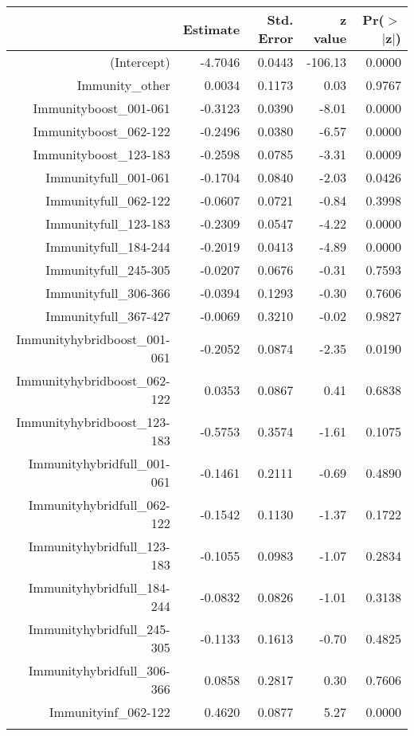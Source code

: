 \begin{table}[ht]
\centering
\begin{tabular}{rrrrr}
  \hline
 & Estimate & Std. Error & z value & Pr($>$$|$z$|$) \\ 
  \hline
(Intercept) & -4.7046 & 0.0443 & -106.13 & 0.0000 \\ 
  Immunity\_other & 0.0034 & 0.1173 & 0.03 & 0.9767 \\ 
  Immunityboost\_001-061 & -0.3123 & 0.0390 & -8.01 & 0.0000 \\ 
  Immunityboost\_062-122 & -0.2496 & 0.0380 & -6.57 & 0.0000 \\ 
  Immunityboost\_123-183 & -0.2598 & 0.0785 & -3.31 & 0.0009 \\ 
  Immunityfull\_001-061 & -0.1704 & 0.0840 & -2.03 & 0.0426 \\ 
  Immunityfull\_062-122 & -0.0607 & 0.0721 & -0.84 & 0.3998 \\ 
  Immunityfull\_123-183 & -0.2309 & 0.0547 & -4.22 & 0.0000 \\ 
  Immunityfull\_184-244 & -0.2019 & 0.0413 & -4.89 & 0.0000 \\ 
  Immunityfull\_245-305 & -0.0207 & 0.0676 & -0.31 & 0.7593 \\ 
  Immunityfull\_306-366 & -0.0394 & 0.1293 & -0.30 & 0.7606 \\ 
  Immunityfull\_367-427 & -0.0069 & 0.3210 & -0.02 & 0.9827 \\ 
  Immunityhybridboost\_001-061 & -0.2052 & 0.0874 & -2.35 & 0.0190 \\ 
  Immunityhybridboost\_062-122 & 0.0353 & 0.0867 & 0.41 & 0.6838 \\ 
  Immunityhybridboost\_123-183 & -0.5753 & 0.3574 & -1.61 & 0.1075 \\ 
  Immunityhybridfull\_001-061 & -0.1461 & 0.2111 & -0.69 & 0.4890 \\ 
  Immunityhybridfull\_062-122 & -0.1542 & 0.1130 & -1.37 & 0.1722 \\ 
  Immunityhybridfull\_123-183 & -0.1055 & 0.0983 & -1.07 & 0.2834 \\ 
  Immunityhybridfull\_184-244 & -0.0832 & 0.0826 & -1.01 & 0.3138 \\ 
  Immunityhybridfull\_245-305 & -0.1133 & 0.1613 & -0.70 & 0.4825 \\ 
  Immunityhybridfull\_306-366 & 0.0858 & 0.2817 & 0.30 & 0.7606 \\ 
  Immunityinf\_062-122 & 0.4620 & 0.0877 & 5.27 & 0.0000 \\ 
$$
\end{tabular}
\end{table}
